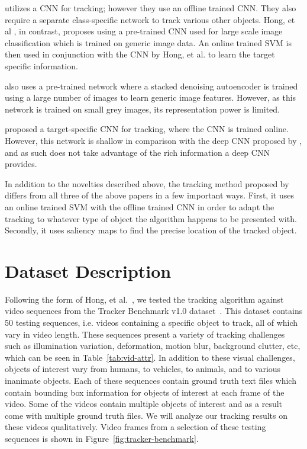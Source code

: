 \documentclass{sig-alternate-05-2015}
\begin{document}
\cite{fan2010human} utilizes a CNN for tracking; however they use an offline trained CNN. They also require a separate class-specific network to track various other objects. Hong, et al \cite{hong2015online}, in contrast, proposes using a pre-trained CNN used for large scale image classification which is trained on generic image data. An online trained SVM is then used in conjunction with the CNN by Hong, et al. to learn the target specific information.

\cite{NIPS2013_5192} also uses a pre-trained network where a stacked denoising autoencoder is trained using a large number of images to learn generic image features. However, as this network is trained on small grey images, its representation power is limited.

\cite{7362006} proposed a target-specific CNN for tracking, where the CNN is trained online. However, this network is shallow in comparison with the deep CNN proposed by \cite{hong2015online}, and as such does not take advantage of the rich information a deep CNN provides.

In addition to the novelties described above, the tracking method proposed by \cite{hong2015online} differs from all three of the above papers in a few important ways.
First, it uses an online trained SVM with the offline trained CNN in order to adapt the tracking to whatever type of object the algorithm happens to be presented with.
Secondly, it uses saliency maps to find the precise location of the tracked object.

\section{Dataset Description}
Following the form of Hong, et al.~\cite{hong2015online}, we tested the tracking algorithm against video sequences from the Tracker Benchmark v1.0 dataset~\cite{wu2013online}. 
This dataset contains 50 testing sequences, i.e. videos containing a specific object to track, all of which vary in video length.
These sequences present a variety of tracking challenges such as illumination variation, deformation, motion blur, background clutter, etc, which can be seen in Table~\ref{tab:vid-attr}.
In addition to these visual challenges, objects of interest vary from humans, to vehicles, to animals, and to various inanimate objects. 
Each of these sequences contain ground truth text files which contain bounding box information for objects of interest at each frame of the video. 
Some of the videos contain multiple objects of interest and as a result come with multiple ground truth files. 
We will analyze our tracking results on these videos qualitatively.
Video frames from a selection of these testing sequences is shown in Figure~\ref{fig:tracker-benchmark}.
\end{document}
